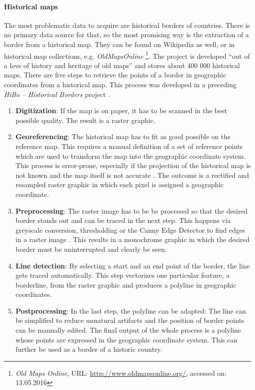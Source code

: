\paragraph{Historical maps} %
\label{par:historical_map}

The most problematic data to acquire are historical borders of countries. There is no primary data source for that, so the most promising way is the extraction of a border from a historical map. They can be found on Wikipedia as well, or in historical map collections, e.g. \emph{OldMapsOnline}
\footnote{
  \textit{Old Maps Online},
  URL: \url{http://www.oldmapsonline.org/},
  accessed on: 13.05.2016
}.
The project is developed ``out of a love of history and heritage of old maps'' and stores about 400 000 historical maps.
There are five steps to retrieve the points of a border in geographic coordinates from a historical map. This process was developed in a preceding \emph{HiBo -- Historical Borders} project \cite{hibo}.

\begin{enumerate}
  \item \textbf{Digitization}: If the map is on paper, it has to be scanned in the best possible quality. The result is a raster graphic.
  \item \textbf{Georeferencing}: The historical map has to fit as good possible on the reference map. This requires a manual definition of a set of reference points which are used to transform the map into the geographic coordinate system. This process is error-prone, especially if the projection of the historical map is not known and the map itself is not accurate
  \cite{knowles2002past}.
  The outcome is a rectified and resampled raster graphic in which each pixel is assigned a geographic coordinate.
  \item \textbf{Preprocessing}: The raster image has to be be processed so that the desired border stands out and can be traced in the next step. This happens via greyscale conversion, thresholding or the Canny Edge Detector to find edges in a raster image \cite{canny}. This results in a monochrome graphic in which the desired border must be uninterrupted and clearly be seen.
  \item \textbf{Line detection}: By selecting a start and an end point of the border, the line gets traced automatically. This step vectorizes one particular feature, a borderline, from the raster graphic and produces a polyline in geographic coordinates.
  \item \textbf{Postprocessing}: In the last step, the polyline can be adapted: The line can be simplified to reduce unnatural artifacts and the position of border points can be manually edited. The final output of the whole process is a polyline whose points are expressed in the geographic coordinate system. This can further be used as a border of a historic country.
\end{enumerate}

